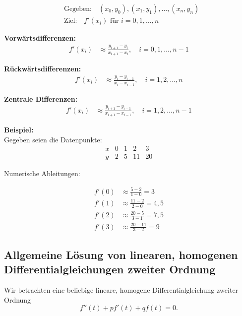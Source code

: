 \documentclass[11pt, openany]{book}
\begin{document}
\begin{align*}
&\text{Gegeben:} \quad (x_0, y_0), (x_1, y_1), \dots, (x_n, y_n) \\
&\text{Ziel:} \quad f'(x_i) \text{ für } i = 0, 1, \dots, n
\end{align*}
\begin{multicols}{2}
\textbf{Vorwärtsdifferenzen:} \\
\begin{align*}
f'(x_i) &\approx \frac{y_{i+1} - y_i}{x_{i+1} - x_i}, \quad i = 0, 1, \dots, n - 1
\end{align*}

\textbf{Rückwärtsdifferenzen:} \\
\begin{align*}
f'(x_i) &\approx \frac{y_i - y_{i-1}}{x_i - x_{i-1}}, \quad i = 1, 2, \dots, n
\end{align*}

\textbf{Zentrale Differenzen:} \\
\begin{align*}
f'(x_i) &\approx \frac{y_{i+1} - y_{i-1}}{x_{i+1} - x_{i-1}}, \quad i = 1, 2, \dots, n - 1
\end{align*}

\columnbreak
\textbf{Beispiel:} \\
Gegeben seien die Datenpunkte:
\[
\begin{array}{c|c|c|c|c}
x & 0 & 1 & 2 & 3 \\
\hline
y & 2 & 5 & 11 & 20
\end{array}
\]

Numerische Ableitungen:

\begin{align*}
f'(0) &\approx \frac{5 - 2}{1 - 0} = 3 \\
f'(1) &\approx \frac{11 - 2}{2 - 0} = 4,5 \\
f'(2) &\approx \frac{20 - 5}{3 - 1} = 7,5 \\
f'(3) &\approx \frac{20 - 11}{3 - 2} = 9
\end{align*}
\end{multicols}
\newpage

\subsection{Allgemeine Lösung von linearen, homogenen Differentialgleichungen zweiter Ordnung}

Wir betrachten eine beliebige lineare, homogene Differentialgleichung zweiter Ordnung
\begin{equation}
    f''(t) + pf'(t) + qf(t) = 0. \tag{1}
\end{equation}
\end{document}
